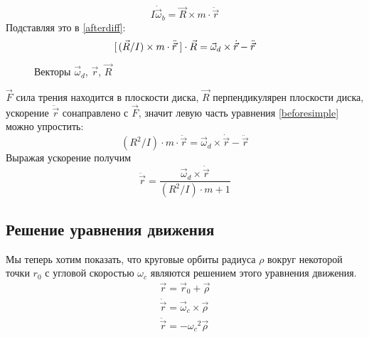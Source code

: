 \documentclass[a4paper,12pt]{article}
\begin{document}
	\begin{equation}
		I\dot{\vec{\omega}}_b=\vec{R}\times m\cdot\ddot{\vec{r}} 
	\end{equation}
	Подставляя это в \eqref{afterdiff}:
	\begin{equation}
		\label{beforesimple}
		[\hspace{0.5mm}(\vec{R}/{I}) \times m \cdot \ddot{\vec{r}}\hspace{1mm}]\cdot\vec{R}=\vec{\omega}_d\times \dot{\vec{r}}-\ddot{\vec{r}}
	\end{equation}
	\begin{figure}[H]
		\centering
		\caption{Векторы $\vec{\omega}_d$, $\vec{r}$, $\vec{R}$}
	\end{figure}
	$\vec{F}$ сила трения находится в плоскости диска, $\vec{R}$ перпендикулярен плоскости диска, ускорение $\ddot{\vec{r}}$ сонаправлено с $\vec{F}$, значит левую часть уравнения \eqref{beforesimple} можно упростить:
	\begin{equation}
		\label{firstsimple}
		(R^2/I)\cdot m \cdot \ddot{\vec{r}}=\vec{\omega}_d\times\dot{\vec{r}}-\ddot{\vec{r}}
	\end{equation}
	Выражая ускорение получим
	\begin{equation}
		\label{ddot r}
		\ddot{\vec{r}}=\frac{\vec{\omega}_d\times\dot{\vec{r}}}{(R^2/I)\cdot m + 1}
	\end{equation}
	
	\subsection{Решение уравнения движения}
	
	Мы теперь хотим показать, что круговые орбиты радиуса $\rho$ вокруг некоторой точки $r_0$ с угловой скоростью $\omega_c$ являются решением этого уравнения движения.\\
	\begin{eqnarray}
		\vec{r}=\vec{r}_0+\vec{\rho}\\
		\dot{\vec{r}}=\vec{\omega}_c\times\vec{\rho}\\
		\ddot{\vec{r}}=-{\omega_c}^2\vec{\rho}
	\end{eqnarray}
	
\end{document}
